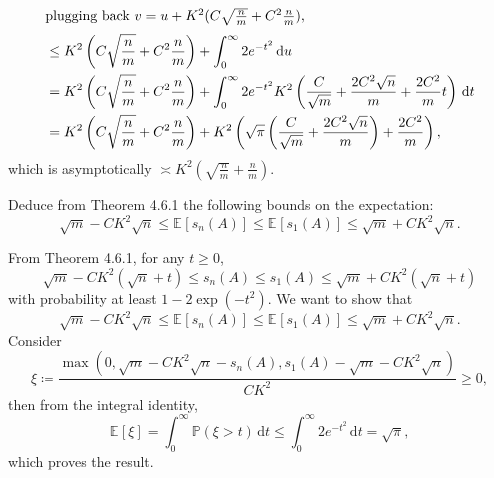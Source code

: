 \begin{answer}
\begin{align*}
		\shortintertext{plugging back \(v = u + K^2 (C \sqrt{\frac{n}{m}} + C^2 \frac{n}{m})\),}
		 & \leq K^2 \left( C \sqrt{\frac{n}{m}} + C^2 \frac{n}{m} \right) + \int_{0}^{\infty} 2 e^{-t^2} \,\mathrm{d}u                                                                                                                                   \\
		 & = K^2 \left( C \sqrt{\frac{n}{m}} + C^2 \frac{n}{m} \right)  + \int_{0}^{\infty} 2 e^{-t^2} K^2 \left( \frac{C}{\sqrt{m} } + \frac{2C^2 \sqrt{n} }{m} + \frac{2C^2}{m}t \right) \,\mathrm{d}t                                                 \\
		 & = K^2 \left( C \sqrt{\frac{n}{m}} + C^2 \frac{n}{m} \right) + K^2 \left( \sqrt{\pi } \left( \frac{C}{\sqrt{m} } + \frac{2C^2 \sqrt{n} }{m} \right) + \frac{2C^2}{m} \right),
	\end{align*}
	which is asymptotically \(\asymp K^2 ( \sqrt{\frac{n}{m}} + \frac{n}{m} )\).
\end{answer}

\begin{problem*}[Exercise 4.6.3]\label{ex4.6.3}
	Deduce from Theorem 4.6.1 the following bounds on the expectation:
	\[
		\sqrt{m} - CK^2 \sqrt{n}
		\leq \mathbb{E}_{}[s_n(A)]
		\leq \mathbb{E}_{}[s_1(A)]
		\leq \sqrt{m} + CK^2 \sqrt{n} .
	\]
\end{problem*}
\begin{answer}
	From Theorem 4.6.1, for any \(t \geq 0\),
	\[
		\sqrt{m} - CK^2 (\sqrt{n} + t)
		\leq s_n(A)
		\leq s_1(A)
		\leq \sqrt{m} + CK^2 (\sqrt{n} + t)
	\]
	with probability at least \(1 - 2 \exp (-t^2)\). We want to show that
	\[
		\sqrt{m} - CK^2 \sqrt{n}
		\leq \mathbb{E}_{}[s_n(A)]
		\leq \mathbb{E}_{}[s_1(A)]
		\leq \sqrt{m} + CK^2 \sqrt{n}.
	\]
	Consider
	\[
		\xi
		\coloneqq \frac{\max \left( 0, \sqrt{m} - CK^2 \sqrt{n} - s_n (A) , s_1(A) - \sqrt{m} - CK^2 \sqrt{n}  \right) }{CK^2}
		\geq 0,
	\]
	then from the integral identity,
	\[
		\mathbb{E}_{}[\xi ]
		= \int_{0}^{\infty} \mathbb{P} (\xi > t) \,\mathrm{d}t
		\leq \int_{0}^{\infty} 2 e^{-t^2} \,\mathrm{d}t
		= \sqrt{\pi },
	\]
	which proves the result.
\end{answer}


